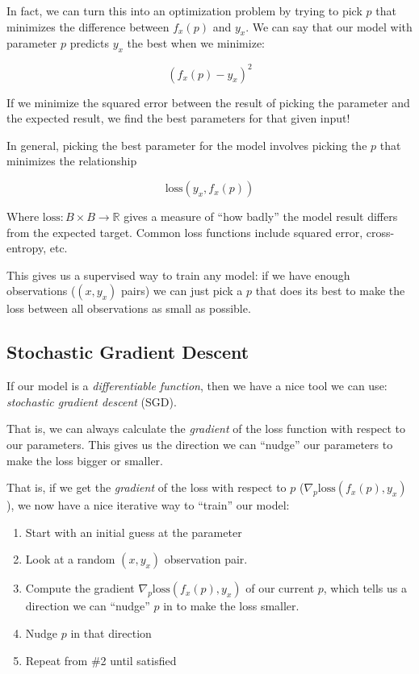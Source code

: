 \documentclass[]{article}
\begin{document}
In fact, we can turn this into an optimization problem by trying to pick \(p\)
that minimizes the difference between \(f_x(p)\) and \(y_x\). We can say that
our model with parameter \(p\) predicts \(y_x\) the best when we minimize:

\[
(f_x(p) - y_x)^2
\]

If we minimize the squared error between the result of picking the parameter and
the expected result, we find the best parameters for that given input!

In general, picking the best parameter for the model involves picking the \(p\)
that minimizes the relationship

\[
\text{loss}(y_x, f_x(p))
\]

Where \(\text{loss} : B \times B \rightarrow \mathbb{R}\) gives a measure of
``how badly'' the model result differs from the expected target. Common loss
functions include squared error, cross-entropy, etc.

This gives us a supervised way to train any model: if we have enough
observations (\((x, y_x)\) pairs) we can just pick a \(p\) that does its best to
make the loss between all observations as small as possible.

\subsection{Stochastic Gradient Descent}\label{stochastic-gradient-descent}

If our model is a \emph{differentiable function}, then we have a nice tool we
can use: \emph{stochastic gradient descent} (SGD).

That is, we can always calculate the \emph{gradient} of the loss function with
respect to our parameters. This gives us the direction we can ``nudge'' our
parameters to make the loss bigger or smaller.

That is, if we get the \emph{gradient} of the loss with respect to \(p\)
(\(\nabla_p
\text{loss}(f_x(p), y_x)\)), we now have a nice iterative way to ``train'' our
model:

\begin{enumerate}
\def\labelenumi{\arabic{enumi}.}
\tightlist
\item
  Start with an initial guess at the parameter
\item
  Look at a random \((x, y_x)\) observation pair.
\item
  Compute the gradient \(\nabla_p \text{loss}(f_x(p), y_x)\) of our current
  \(p\), which tells us a direction we can ``nudge'' \(p\) in to make the loss
  smaller.
\item
  Nudge \(p\) in that direction
\item
  Repeat from \#2 until satisfied
\end{enumerate}
\end{document}
